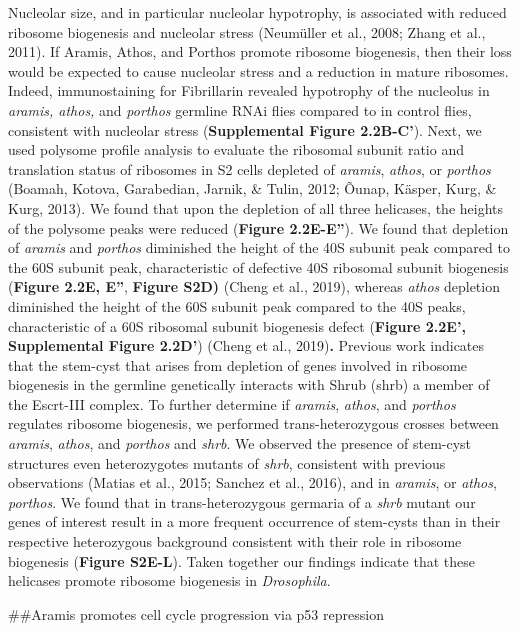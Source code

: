 \documentclass[12pt,twoside]{reedthesis}
\begin{document}
Nucleolar size, and in particular nucleolar hypotrophy, is associated
with reduced ribosome biogenesis and nucleolar stress (Neumüller et al., 2008; Zhang et al., 2011). If Aramis, Athos, and Porthos
promote ribosome biogenesis, then their loss would be expected to cause
nucleolar stress and a reduction in mature ribosomes. Indeed,
immunostaining for Fibrillarin revealed hypotrophy of the nucleolus in
\emph{aramis, athos,} and \emph{porthos} germline RNAi flies compared to in
control flies, consistent with nucleolar stress (\textbf{Supplemental Figure 2.2B-C'}).
Next, we used polysome profile analysis to evaluate the ribosomal
subunit ratio and translation status of ribosomes in S2 cells depleted
of \emph{aramis}, \emph{athos}, or \emph{porthos}
(Boamah, Kotova, Garabedian, Jarnik, \& Tulin, 2012; Õunap, Käsper, Kurg, \& Kurg, 2013).
We found that upon the depletion of all three helicases, the heights of
the polysome peaks were reduced (\textbf{Figure 2.2E-E''}). We found that
depletion of \emph{aramis} and \emph{porthos} diminished the height of the 40S
subunit peak compared to the 60S subunit peak, characteristic of
defective 40S ribosomal subunit biogenesis (\textbf{Figure 2.2E, E''}, \textbf{Figure
S2D)} (Cheng et al., 2019), whereas \emph{athos} depletion
diminished the height of the 60S subunit peak compared to the 40S peaks,
characteristic of a 60S ribosomal subunit biogenesis defect (\textbf{Figure
2.2E', Supplemental Figure 2.2D'}) (Cheng et al., 2019)\textbf{.} Previous
work indicates that the stem-cyst that arises from depletion of genes
involved in ribosome biogenesis in the germline genetically interacts
with Shrub (shrb) a member of the Escrt-III complex. To further
determine if \emph{aramis}, \emph{athos}, and \emph{porthos} regulates ribosome
biogenesis, we performed trans-heterozygous crosses between \emph{aramis},
\emph{athos}, and \emph{porthos} and \emph{shrb}. We observed the presence of stem-cyst
structures even heterozygotes mutants of \emph{shrb}, consistent with
previous observations (Matias et al., 2015; Sanchez et al., 2016), and in
\emph{aramis}, or \emph{athos}, \emph{porthos}. We found that in trans-heterozygous
germaria of a \emph{shrb} mutant our genes of interest result in a more
frequent occurrence of stem-cysts than in their respective heterozygous
background consistent with their role in ribosome biogenesis (\textbf{Figure
S2E-L}). Taken together our findings indicate that these helicases
promote ribosome biogenesis in \emph{Drosophila}.

\#\#Aramis promotes cell cycle progression via p53 repression
\end{document}
